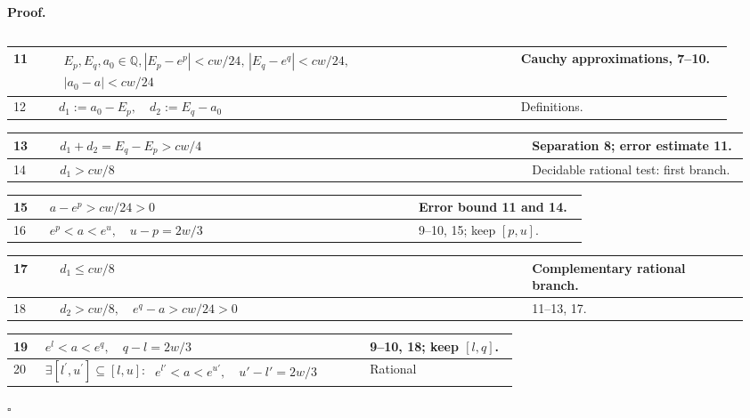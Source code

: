 \documentclass[11pt,reqno]{amsart}
\theoremstyle{redplain}
\renewcommand{\qedsymbol}{\textcolor{proofqed}{\ensuremath{\square}}}
\renewenvironment{proof}[1][Proof]{\par\noindent\textbf{\textcolor{proofhead}{#1.}}\par\nobreak}{\par\nobreak\hfill\qedsymbol}
\numberwithin{equation}{section}
\begin{document}
\begin{proof}
\begin{tabular}{|@{}p{0.06\linewidth}p{0.61\linewidth}p{0.29\linewidth}}
\end{tabular}%
\noindent \text{ \ }\newline
\noindent 
\begin{tabular}{|@{}p{0.06\linewidth}p{0.61\linewidth}p{0.29\linewidth}}
\hline
11 & $\begin{gathered}E_p,E_q,a_0\in\mathbb Q, |E_p-e^p|<cw/24,\, 
|E_q-e^q|<cw/24,\,\\ |a_0-a|<cw/24\end{gathered}$ & Cauchy
approximations, 7--10. \\ \hline
12 & $d_1:=a_0-E_p,\quad d_2:=E_q-a_0$ & Definitions. \\ 
\end{tabular}%
\noindent \text{ \ }\newline
\noindent  
\begin{tabular}{|@{}p{0.06\linewidth}p{0.61\linewidth}p{0.29\linewidth}}
\hline
13 & $d_1+d_2=E_q-E_p>cw/4$ & Separation 8; error estimate
11. \\ \hline
14 & $d_1>cw/8$ & Decidable rational test: first branch. \\ 
\end{tabular}%
\noindent \text{ \ }\newline
\noindent 
\begin{tabular}{|@{}p{0.06\linewidth}p{0.61\linewidth}p{0.29\linewidth}}
\hline
15 & $a-e^p>cw/24>0$ & Error bound 11 and 14. \\ \hline
16 & $e^p<a<e^u,\quad u-p=2w/3$ & 9--10, 15; keep $[p,u]$. \\ 
\end{tabular}%
\noindent \text{ \ }\newline
\noindent 
\begin{tabular}{|@{}p{0.06\linewidth}p{0.61\linewidth}p{0.29\linewidth}}
\hline
17 & $d_1\le cw/8$ & Complementary rational branch. \\ \hline
18 & $d_2>cw/8,\quad e^q-a>cw/24>0$ & 11--13, 17. \\ 
\end{tabular}%
\noindent \text{ \ }\newline
\noindent 
\begin{tabular}{|@{}p{0.06\linewidth}p{0.61\linewidth}p{0.29\linewidth}}
\hline
19 & $e^l<a<e^q,\quad q-l=2w/3$ & 9--10, 18; keep $[l,q]$. \\ \hline
20 &  $\exists[l^{\prime },u^{\prime }]\subseteq[l,u]:\ %
\begin{gathered}e^{l'}<a<e^{u'},\quad u'-l'=2w/3\end{gathered}$ & Rational

\end{tabular}
\end{proof}
\end{document}
